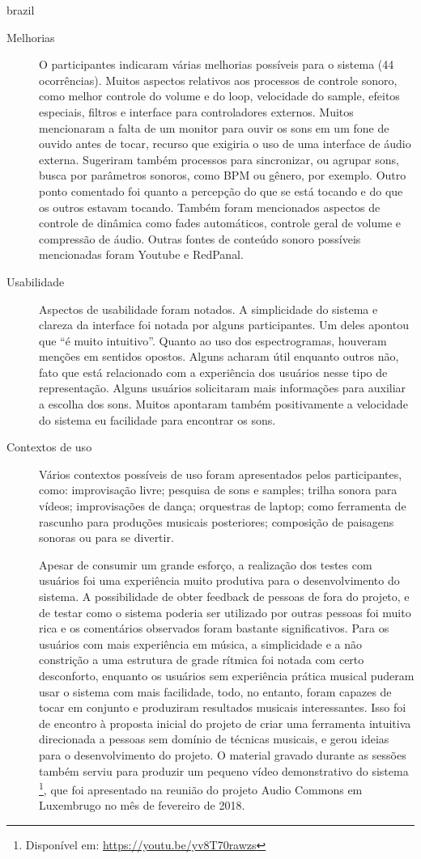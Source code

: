 \begin{otherlanguage*}{brazil}
\begin{description}
\item[Melhorias] O participantes indicaram várias melhorias possíveis para o sistema (44 ocorrências). Muitos aspectos relativos aos processos de controle sonoro, como melhor controle do volume e do loop, velocidade do sample, efeitos especiais, filtros e interface para controladores externos. Muitos mencionaram a falta de um monitor para ouvir os sons em um fone de ouvido antes de tocar, recurso que exigiria o uso de uma interface de áudio externa. Sugeriram também processos para sincronizar, ou agrupar sons, busca por parâmetros sonoros, como BPM ou gênero, por exemplo. Outro ponto comentado foi quanto a percepção do que se está tocando e do que os outros estavam tocando. Também foram mencionados aspectos de controle de dinâmica como fades automáticos, controle geral de volume e compressão de áudio. Outras fontes de conteúdo sonoro possíveis mencionadas foram Youtube e RedPanal.

\item[Usabilidade] Aspectos de usabilidade foram notados. A simplicidade do sistema e clareza da interface foi notada por alguns participantes. Um deles apontou que ``é muito intuitivo''. Quanto ao uso dos espectrogramas, houveram menções em sentidos opostos. Alguns acharam útil enquanto outros não, fato que está relacionado com a experiência dos usuários nesse tipo de representação. Alguns usuários solicitaram mais informações para auxiliar a escolha dos sons. Muitos apontaram também positivamente a velocidade do sistema eu facilidade para encontrar os sons.

\item[Contextos de uso] Vários contextos possíveis de uso foram apresentados pelos participantes, como: improvisação livre; pesquisa de sons e samples; trilha sonora para vídeos; improvisações de dança; orquestras de laptop; como ferramenta de rascunho para produções musicais posteriores; composição de paisagens sonoras ou para se divertir.

Apesar de consumir um grande esforço, a realização dos testes com usuários foi uma experiência muito produtiva para o desenvolvimento do sistema. A possibilidade de obter feedback de pessoas de fora do projeto, e de testar como o sistema poderia ser utilizado por outras pessoas foi muito rica e os comentários observados foram bastante significativos. Para os usuários com mais experiência em música, a simplicidade e a não constrição a uma estrutura de grade rítmica foi notada com certo desconforto, enquanto os usuários sem experiência prática musical puderam usar o sistema com mais facilidade, todo, no entanto, foram capazes de tocar em conjunto e produziram resultados musicais interessantes. Isso foi de encontro à proposta inicial do projeto de criar uma ferramenta intuitiva direcionada a pessoas sem domínio de técnicas musicais, e gerou ideias para o desenvolvimento do projeto. O material gravado durante as sessões também serviu para produzir um pequeno vídeo demonstrativo do sistema \footnote{Disponível em: \url{https://youtu.be/yv8T70rawzs}}, que foi apresentado na reunião do projeto Audio Commons em Luxembrugo no mês de fevereiro de 2018. 




\end{description}
\end{otherlanguage*}
